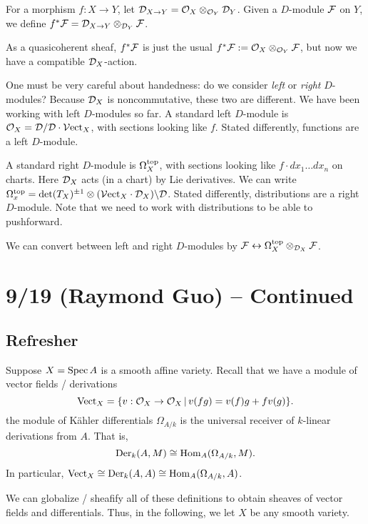 \documentclass{article}
\begin{document}
\begin{dfn}
	For a morphism $f: X \to Y$, let $\mathcal{D}_{X \to Y} = \mathcal{O}_X \otimes_{\mathcal{O}_Y} \mathcal{D}_Y$.
	Given a $D$-module $\mathcal{F}$ on $Y$, we define $f^* \mathcal{F} = \mathcal{D}_{X \to Y} \otimes_{\mathcal{D}_Y} \mathcal{F}$.
\end{dfn}

As a quasicoherent sheaf, $f^* \mathcal{F}$ is just the usual $f^* \mathcal{F} := \mathcal{O}_X \otimes_{\mathcal{O}_Y} \mathcal{F}$, but now we have a compatible $\mathcal{D}_X$-action.

\begin{rmk}
	One must be very careful about handedness: do we consider \emph{left} or \emph{right} $D$-modules?
	Because $\mathcal{D}_X$ is noncommutative, these two are different.
	We have been working with left $D$-modules so far.
	A standard left $D$-module is $\mathcal{O}_X = \mathcal{D} / \mathcal{D} \cdot \mathcal{V}\mathrm{ect}_X$, with sections looking like $f$.
	Stated differently, functions are a left $D$-module.

	A standard right $D$-module is $\Omega_X^{\mathrm{top}}$, with sections looking like $f \cdot dx_1 \dots dx_n$ on charts.
	Here $\mathcal{D}_X$ acts (in a chart) by Lie derivatives.
	We can write $\Omega_x^{\mathrm{top}} = \det(T_X)^{\pm 1} \otimes (\mathcal{V}\mathrm{ect}_X \cdot \mathcal{D}_X) \backslash \mathcal{D}$.
	Stated differently, distributions are a right $D$-module.
	Note that we need to work with distributions to be able to pushforward.

	We can convert between left and right $D$-modules by $\mathcal{F} \leftrightarrow \Omega_X^{\mathrm{top}} \otimes_{\mathcal{D}_X} \mathcal{F}$.
\end{rmk}

\section{9/19 (Raymond Guo) -- Continued}

\subsection{Refresher}

Suppose $X = \operatorname{Spec} A$ is a smooth affine variety.
Recall that we have a module of vector fields / derivations
\[
	\mathrm{Vect}_X = \{ v: \mathcal{O}_X \to \mathcal{O}_X \,|\, v(fg) = v(f)g + f v(g) \}.
\]
the module of K\"ahler differentials $\Omega_{A/k}$ is the universal receiver of $k$-linear derivations from $A$.
That is,
\[
	\operatorname{Der}_k(A, M) \cong \operatorname{Hom}_A(\Omega_{A/k}, M).
\]
In particular, $\mathrm{Vect}_X \cong \operatorname{Der}_k(A, A) \cong \operatorname{Hom}_A(\Omega_{A/k}, A)$.

We can globalize / sheafify all of these definitions to obtain sheaves of vector fields and differentials.
Thus, in the following, we let $X$ be any smooth variety.
\end{document}

